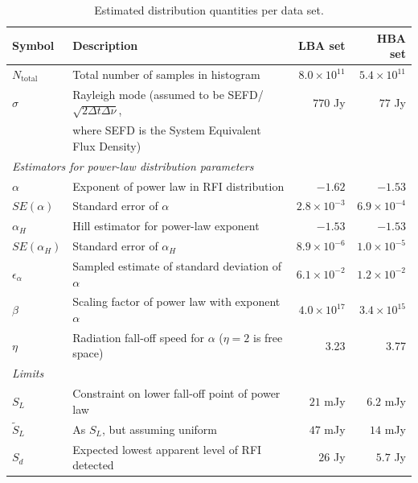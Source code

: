 \documentclass[useAMS,usenatbib]{mn2e}
\newcommand{\editmark}[1]{{\color{red}{\textbf{#1}}}}
\begin{document}
\begin{table}
\centering
\begin{minipage}{12cm}
\caption{Estimated distribution quantities per data set. }\label{table:dist-data-quantities}
\begin{tabular}{@{}llrr@{}}
\textbf{Symbol} & \textbf{Description} & \textbf{LBA set}& \textbf{HBA set} \\
\hline
\hline
$N_\textrm{total}$ & Total number of samples in histogram & $8.0\times10^{11}$ & $5.4\times10^{11}$ \\
$\sigma$ & Rayleigh mode (assumed to be SEFD/$\sqrt{2\Delta t \Delta \nu}$, & $770$ Jy & $77$ Jy \\
 & where SEFD is the System Equivalent Flux Density) & & \\
\hline
\multicolumn{4}{l}{\textit{Estimators for power-law distribution parameters}} \\
\hline
$\alpha$ & Exponent of power law in RFI distribution      & $-1.62$ & $-1.53$ \\ %
$SE(\alpha)$ & Standard error of $\alpha$ & $2.8 \times 10^{-3}$ & $6.9 \times 10^{-4}$ \\
$\alpha_H$ & Hill estimator for power-law exponent & $-1.53$ & $-1.53$ \\
$SE(\alpha_H)$ & Standard error of $\alpha_H$ & $8.9 \times 10^{-6}$ & $1.0\times10^{-5}$ \\
$\epsilon_{\alpha}$ & Sampled estimate of standard deviation of $\alpha$ & $6.1 \times 10^{-2}$ & $1.2 \times 10^{-2}$ \\
$\beta$ & Scaling factor of power law with exponent $\alpha$ & $4.0 \times 10^{17}$ & $3.4\times 10^{15}$ \\
$\eta$ & Radiation fall-off speed for $\alpha$ ($\eta=2$ is free space) & 3.23 & 3.77 \\
\hline
\multicolumn{4}{l}{\textit{Limits}} \\
\hline
$S_L$ & Constraint on lower fall-off point of power law & $21$ mJy & $6.2$ mJy \\ %
$\tilde{S}_L$ & As $S_L$, but assuming \editmark{$Ig/r^\eta\sim$} uniform & $47$ mJy & $14$ mJy \\ %
$S_d$ & Expected lowest apparent level of RFI detected & $26$ Jy & $5.7$ Jy\\ %

\end{tabular}
\end{minipage}
\end{table}
\end{document}
